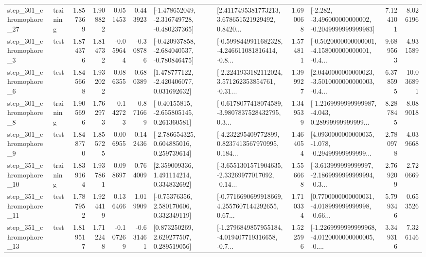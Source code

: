 \begin{tabular}{llrrrrllrlrr}
  step\_301\_chromophore\_27 &  training &      1.857369 &    1.908822 &      0.051453 &  0.443923 &  [-1.478652049, -2.316749728, -0.480237365] &  [2.4117495381773213, 3.678651521929492, 0.8420... &       1.690068 &  [-2.282, -3.496000000000002, -0.2049999999999983] &            7.124101 &          8.026196 \\
   step\_301\_chromophore\_3 &      test &      1.874376 &    1.814732 &     -0.059644 & -0.308786 &  [-0.420937858, -2.684040537, -0.780846475] &  [-0.5998449911682328, -4.246611081816414, -0.8... &       1.574811 &  [-0.5020000000000001, -4.158000000000001, -0.4... &            9.689563 &          4.931589 \\
   step\_301\_chromophore\_6 &      test &      1.845668 &    1.932022 &      0.086355 &  0.680389 &    [1.478777122, -2.420406077, 0.031692632] &  [-2.2241933182112024, 3.571262353854761, -0.31... &       1.399927 &  [2.0440000000000023, -3.5010000000000003, -0.4... &            6.378595 &         10.036891 \\
   step\_301\_chromophore\_8 &  training &      1.905696 &    1.762973 &     -0.142723 & -0.871669 &    [-0.40155815, -2.655805145, 0.261360581] &  [-0.6178077418074589, -3.9807837528432795, 0.3... &       1.349539 &  [-1.2169999999999987, -4.043, 0.28999999999999... &            8.287845 &          8.089018 \\
   step\_301\_chromophore\_9 &      test &      1.848770 &    1.855725 &      0.006955 &  0.142436 &    [-2.786654325, 0.604885016, 0.259739614] &  [-4.232295409772899, 0.8237413567970995, 0.184... &       1.464054 &  [4.0930000000000035, -1.078, -0.29499999999999... &            2.780978 &          4.039668 \\
  step\_351\_chromophore\_10 &  training &      1.839164 &    1.937861 &      0.098697 &  0.764009 &     [2.359009336, 1.491114214, 0.334832692] &  [-3.6551301571904635, -2.33269977017092, -0.14... &       1.556668 &  [-3.613999999999997, -2.1869999999999994, -0.3... &            2.769209 &          2.720669 \\
  step\_351\_chromophore\_11 &      test &      1.787952 &    1.924419 &      0.136466 &  1.019909 &     [-0.75376356, 2.580170606, 0.332349119] &  [-0.7716690699918669, 4.2557607144292655, 0.67... &       1.710334 &  [0.7700000000000031, -4.018999999999998, -0.66... &            5.799346 &          0.653526 \\
  step\_351\_chromophore\_13 &      test &      1.819517 &    1.712248 &     -0.107269 & -0.631461 &     [0.873250269, 2.629277507, 0.289519056] &  [-1.2796849857955184, -4.019407719316658, -0.7... &       1.522596 &  [-1.2269999999999968, -4.0120000000000005, -0.... &            3.349316 &          7.326146 \\

\end{tabular}
